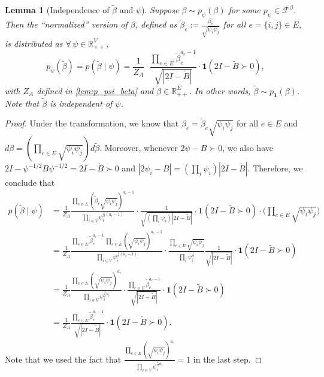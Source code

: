 \documentclass[a4paper, 11pt]{article}
\newcommand{\allone}{\mathbf{1}}
\newcommand{\ind}{\mathbf{1}}
\newtheorem{lem}[thm]{Lemma}
\begin{document}
\vspace{.5em}
\begin{lem}[Independence of $\tilde \beta$ and $\psi$]
    \label{lem:p_psi_beta_norm}
    Suppose $\beta\sim p_\psi(\beta)$ for some $p_\psi\in \mathcal{F}^\beta$. Then the ``normalized'' version of $\beta$, defined as $\tilde{\beta}_e:=\frac{\beta_e}{\sqrt{\psi_i\psi_j}}$ for all $e=\{i,j\}\in E$, is distributed as $\forall \,\psi\in\mathbb{R}_{++}^V$,
    \begin{equation}
        \label{eqn:p_psi_beta_norm}
        p_{\psi}(\tilde{\beta})=p(\tilde{\beta}\mid \psi)
        = \frac{1}{Z_A}\cdot \frac{\prod_{e\in E}\tilde{\beta}_e^{a_e-1}}{\sqrt{|2I-\tilde{B}|}}\cdot \ind(2I-\tilde{B}\succ 0),
    \end{equation}
    with $Z_A$ defined in \cref{lem:p_psi_beta} and $\tilde{\beta}\in\mathbb{R}_{++}^E$. In other words, $\tilde{\beta}\sim p_\allone(\beta)$. Note that $\tilde{\beta}$ is independent of $\psi$.
\end{lem}
\begin{proof}
    Under the transformation, we know that $\beta_e=\tilde{\beta}_e\sqrt{\psi_i\psi_j}$ for all $e\in E$ and $d\beta=(\prod_{e\in E}\sqrt{\psi_i\psi_j})d\tilde{\beta}$. Moreover, whenever $2\psi-B\succ 0$, we also have $2I-\psi^{-1/2}B\psi^{-1/2}=2I-\tilde{B}\succ 0$ and $|2\psi_i-B|=(\prod_i\psi_i)|2I-\tilde{B}|$. Therefore, we conclude that
    \begin{align*}
        p(\tilde{\beta}\mid \psi) 
        &= \frac{1}{Z_A}\frac{\prod_{e\in E}(\tilde{\beta}_e\sqrt{\psi_i\psi_j})^{a_e-1}}{\prod_{i\in V}\psi_i^{\frac{1}{2}(a_i-1)}}\cdot \frac{1}{\sqrt{(\prod_i\psi_i)|2I-\tilde{B}|}}\cdot \ind(2I-\tilde{B}\succ 0)\cdot \big(\prod_{e\in E}\sqrt{\psi_i\psi_j}\big)\\
        &= \frac{1}{Z_A}\frac{\prod_{e\in E}\tilde{\beta}_e^{a_e-1}\,\prod_{e\in E}(\sqrt{\psi_i\psi_j})^{a_e-1}}{\prod_{i\in V}\psi_i^{\frac{1}{2}(a_i-1)}}\cdot \frac{\prod_{e\in E}\sqrt{\psi_i\psi_j}}{\prod_i\psi_i^{\frac{1}{2}}}\frac{1}{\sqrt{|2I-\tilde{B}|}}\cdot \ind(2I-\tilde{B}\succ 0)\\
        &= \frac{1}{Z_A}\frac{\prod_{e\in E}(\sqrt{\psi_i\psi_j})^{a_e}}{\prod_{i\in V}\psi_i^{\frac{1}{2}a_i}}\cdot \frac{\prod_{e\in E}\tilde{\beta}_e^{a_e-1}}{\sqrt{|2I-\tilde{B}|}}\cdot \ind(2I-\tilde{B}\succ 0)\\
        &= \frac{1}{Z_A}\frac{\prod_{e\in E}\tilde{\beta}_e^{a_e-1}}{\sqrt{|2I-\tilde{B}|}}\cdot \ind(2I-\tilde{B}\succ 0).
    \end{align*}
    Note that we used the fact that $\frac{\prod_{e\in E}(\sqrt{\psi_i\psi_j})^{a_e}}{\prod_{i\in V}\psi_i^{\frac{1}{2}a_i}}=1$ in the last step.
\end{proof}
\end{document}
